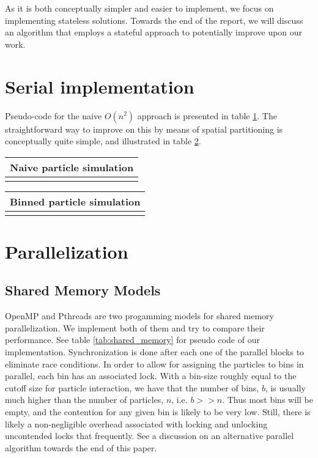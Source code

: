 \documentclass[11pt]{article}
\begin{document}
As it is both conceptually simpler and easier to implement, we focus on implementing stateless solutions. Towards the end of the report, we will discuss an algorithm that employs a stateful approach to potentially improve upon our work.

\section{Serial implementation}
Pseudo-code for the naive $O(n^2)$ approach is presented in table \ref{tab:naive}. The straightforward way to improve on this by means of spatial partitioning is conceptually quite simple, and illustrated in table \ref{tab:serial}.

\begin{table}[htb]
  \centering
  \begin{tabular}{l}
    \hline
      Naive particle simulation\\
    \hline
      \\
    \hline
  \end{tabular}
  \label{tab:naive}
\end{table}

\begin{table}[htb]
  \centering
  \begin{tabular}{l}
    \hline
      Binned particle simulation\\
    \hline
      \\
    \hline
  \end{tabular}
  \label{tab:serial}
\end{table}

\FloatBarrier

\section{Parallelization}
\subsection{Shared Memory Models}
OpenMP and Pthreads are two progamming models for shared memory parallelization. We implement both of them and try to compare their performance. See table \ref{tab:shared_memory} for pseudo code of our implementation. Synchronization is done after each one of the parallel blocks to eliminate race conditions. In order to allow for assigning the particles to bins in parallel, each bin has an associated lock. With a bin-size roughly equal to the cutoff size for particle interaction, we have that the number of bins, $b$, is usually much higher than the number of particles, $n$, i.e. $b >> n$. Thus most bins will be empty, and the contention for any given bin is likely to be very low. Still, there is likely a non-negligible overhead associated with locking and unlocking uncontended locks that frequently. See a discussion on an alternative parallel algorithm towards the end of this paper.
\end{document}
